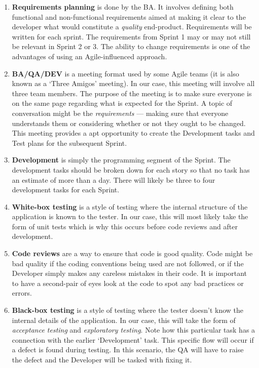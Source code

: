 \documentclass[12pt]{article}
\begin{document}
\begin{enumerate}
    \item \textbf{Requirements planning} is done by the BA. It involves defining both functional and non-functional requirements aimed at making it clear to the developer what would constitute a \emph{quality} end-product. Requirements will be written for each sprint. The requirements from Sprint 1 may or may not still be relevant in Sprint 2 or 3. The ability to change requirements is one of the advantages of using an Agile-influenced approach.
    \item \textbf{BA/QA/DEV} is a meeting format used by some Agile teams (it is also known as a `Three Amigos' meeting). In our case, this meeting will involve all three team members. The purpose of the meeting is to make sure everyone is on the same page regarding what is expected for the Sprint. A topic of conversation might be the \emph{requirements} --- making sure that everyone understands them or considering whether or not they ought to be changed. This meeting provides a apt opportunity to create the Development tasks and Test plans for the subsequent Sprint.
    \item \textbf{Development} is simply the programming segment of the Sprint. The development tasks should be broken down for each story so that no task has an estimate of more than a day. There will likely be three to four development tasks for each Sprint.
    \item \textbf{White-box testing} is a style of testing where the internal structure of the application is known to the tester. In our case, this will most likely take the form of unit tests which is why this occurs before code reviews and after development. 
    \item \textbf{Code reviews} are a way to ensure that code is good quality. Code might be bad quality if the coding conventions being used are not followed, or if the Developer simply makes any careless mistakes in their code. It is important to have a second-pair of eyes look at the code to spot any bad practices or errors.
    \item \textbf{Black-box testing} is a style of testing where the tester doesn't know the internal details of the application. In our case, this will take the form of \emph{acceptance testing} and \emph{exploratory testing}. Note how this particular task has a connection with the earlier `Development' task. This specific flow will occur if a defect is found during testing. In this scenario, the QA will have to raise the defect and the Developer will be tasked with fixing it.

\end{enumerate}
\end{document}
